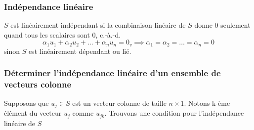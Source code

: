 \subsubsection{Indépendance linéaire}
\begin{definition}
      $S$ est linéairement indépendant si la combinaison linéaire de $S$ donne 0 seulement quand tous les scalaires sont 0, c.-à.-d.
      \[
            \alpha_1 u_1 + \alpha_2 u_2 + \ldots + \alpha_n u_n = 0_v \implies \alpha_1 = \alpha_2 = \ldots = \alpha_n = 0
      \]
      sinon $S$ est linéairement dépendant ou lié.
\end{definition}

\subsubsection{Déterminer l'indépendance linéaire d'un ensemble de vecteurs colonne}
Supposons que $u_j \in S$ est un vecteur colonne de taille $n \times 1$. Notons k-ème élément du vecteur $u_j$ comme $u_{jk}$. Trouvons une condition pour l'indépendance linéaire de $S$
